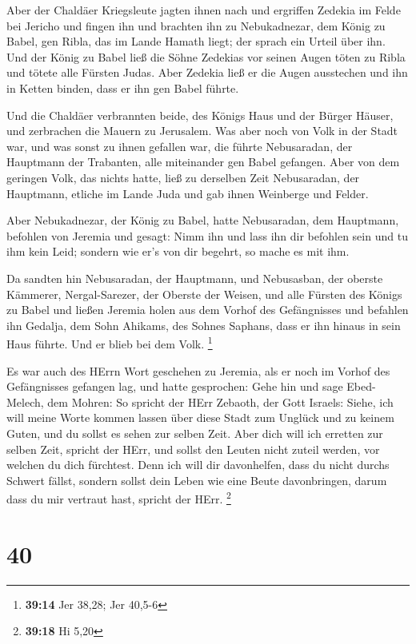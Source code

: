  Aber der Chaldäer Kriegsleute jagten ihnen nach und
ergriffen Zedekia im Felde bei Jericho und fingen ihn und brachten ihn
zu Nebukadnezar, dem König zu Babel, gen Ribla, das im Lande Hamath
liegt; der sprach ein Urteil über ihn.  Und der König zu
Babel ließ die Söhne Zedekias vor seinen Augen töten zu Ribla und tötete
alle Fürsten Judas.  Aber Zedekia ließ er die Augen
ausstechen und ihn in Ketten binden, dass er ihn gen Babel führte.

 Und die Chaldäer verbrannten beide, des Königs Haus und der
Bürger Häuser, und zerbrachen die Mauern zu Jerusalem.  Was
aber noch von Volk in der Stadt war, und was sonst zu ihnen gefallen
war, die führte Nebusaradan, der Hauptmann der Trabanten, alle
miteinander gen Babel gefangen.  Aber von dem geringen
Volk, das nichts hatte, ließ zu derselben Zeit Nebusaradan, der
Hauptmann, etliche im Lande Juda und gab ihnen Weinberge und Felder.

 Aber Nebukadnezar, der König zu Babel, hatte Nebusaradan,
dem Hauptmann, befohlen von Jeremia und gesagt:  Nimm ihn
und lass ihn dir befohlen sein und tu ihm kein Leid; sondern wie er's
von dir begehrt, so mache es mit ihm.

 Da sandten hin Nebusaradan, der Hauptmann, und Nebusasban,
der oberste Kämmerer, Nergal-Sarezer, der Oberste der Weisen, und alle
Fürsten des Königs zu Babel  und ließen Jeremia holen aus
dem Vorhof des Gefängnisses und befahlen ihn Gedalja, dem Sohn Ahikams,
des Sohnes Saphans, dass er ihn hinaus in sein Haus führte. Und er blieb
bei dem Volk. \footnote{\textbf{39:14} Jer 38,28; Jer 40,5-6}

 Es war auch des HErrn Wort geschehen zu Jeremia, als er
noch im Vorhof des Gefängnisses gefangen lag, und hatte gesprochen:
 Gehe hin und sage Ebed-Melech, dem Mohren: So spricht der
HErr Zebaoth, der Gott Israels: Siehe, ich will meine Worte kommen
lassen über diese Stadt zum Unglück und zu keinem Guten, und du sollst
es sehen zur selben Zeit.  Aber dich will ich erretten zur
selben Zeit, spricht der HErr, und sollst den Leuten nicht zuteil
werden, vor welchen du dich fürchtest.  Denn ich will dir
davonhelfen, dass du nicht durchs Schwert fällst, sondern sollst dein
Leben wie eine Beute davonbringen, darum dass du mir vertraut hast,
spricht der HErr. \footnote{\textbf{39:18} Hi 5,20}

\hypertarget{section-9}{%
\section{40}\label{section-9}}

